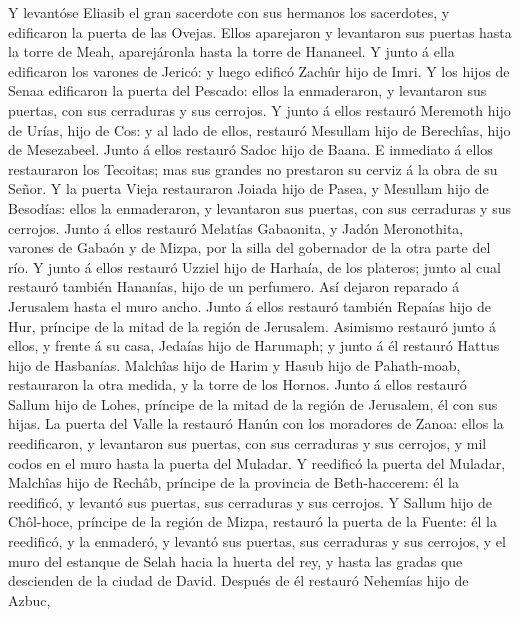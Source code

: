  Y levantóse Eliasib el gran sacerdote con sus hermanos
los sacerdotes, y edificaron la puerta de las Ovejas. Ellos aparejaron y
levantaron sus puertas hasta la torre de Meah, aparejáronla hasta la
torre de Hananeel.  Y junto á ella edificaron los varones
de Jericó: y luego edificó Zachûr hijo de Imri.  Y los
hijos de Senaa edificaron la puerta del Pescado: ellos la enmaderaron, y
levantaron sus puertas, con sus cerraduras y sus cerrojos.
 Y junto á ellos restauró Meremoth hijo de Urías, hijo de
Cos: y al lado de ellos, restauró Mesullam hijo de Berechîas, hijo de
Mesezabeel. Junto á ellos restauró Sadoc hijo de Baana.  E
inmediato á ellos restauraron los Tecoitas; mas sus grandes no prestaron
su cerviz á la obra de su Señor.  Y la puerta Vieja
restauraron Joiada hijo de Pasea, y Mesullam hijo de Besodías: ellos la
enmaderaron, y levantaron sus puertas, con sus cerraduras y sus
cerrojos.  Junto á ellos restauró Melatías Gabaonita, y
Jadón Meronothita, varones de Gabaón y de Mizpa, por la silla del
gobernador de la otra parte del río.  Y junto á ellos
restauró Uzziel hijo de Harhaía, de los plateros; junto al cual restauró
también Hananías, hijo de un perfumero. Así dejaron reparado á Jerusalem
hasta el muro ancho.  Junto á ellos restauró también
Repaías hijo de Hur, príncipe de la mitad de la región de Jerusalem.
 Asimismo restauró junto á ellos, y frente á su casa,
Jedaías hijo de Harumaph; y junto á él restauró Hattus hijo de
Hasbanías.  Malchîas hijo de Harim y Hasub hijo de
Pahath-moab, restauraron la otra medida, y la torre de los Hornos.
 Junto á ellos restauró Sallum hijo de Lohes, príncipe de
la mitad de la región de Jerusalem, él con sus hijas.  La
puerta del Valle la restauró Hanún con los moradores de Zanoa: ellos la
reedificaron, y levantaron sus puertas, con sus cerraduras y sus
cerrojos, y mil codos en el muro hasta la puerta del Muladar.
 Y reedificó la puerta del Muladar, Malchîas hijo de
Rechâb, príncipe de la provincia de Beth-haccerem: él la reedificó, y
levantó sus puertas, sus cerraduras y sus cerrojos.  Y
Sallum hijo de Chôl-hoce, príncipe de la región de Mizpa, restauró la
puerta de la Fuente: él la reedificó, y la enmaderó, y levantó sus
puertas, sus cerraduras y sus cerrojos, y el muro del estanque de Selah
hacia la huerta del rey, y hasta las gradas que descienden de la ciudad
de David.  Después de él restauró Nehemías hijo de Azbuc,
